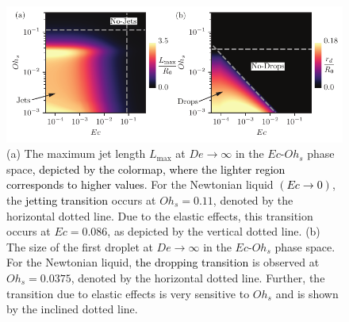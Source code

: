 \documentclass{jfm}
\newcommand{\DL}[1]{{\textcolor{black}{#1}}}
\newcommand{\VS}[1]{{\textcolor{black}{#1}}}
\newcommand{\AO}[1]{{\textcolor{black}{#1}}}
\newcommand{\AKD}[1]{{\textcolor{black}{#1}}}
\begin{document}
\begin{figure}
	\includegraphics[width=\textwidth]{Figures/High_De/High_De_05-eps-converted-to.pdf}
	\caption{(a) The maximum jet length $L_{\text{max}}$ at $De \to \infty$ in the $Ec$-$Oh_s$ phase space\AKD{, depicted by the colormap, where the lighter region corresponds to higher values}. For the Newtonian liquid \DL{$\left(Ec \to 0\right)$}, the \VS{jetting transition} occurs at $Oh_s = 0.11$, denoted by the horizontal dotted line. Due to the elastic effect\AO{s}, this transition occurs at $Ec = 0.086$, as depicted by the vertical dotted line. (b) The size of the first droplet at $De \to \infty$ in the $Ec$-$Oh_s$ phase space. For the Newtonian liquid, \VS{the dropping transition} is observed at $Oh_s = 0.0375$, denoted by the horizontal dotted line. Further, the transition due to elastic effects is very sensitive to $Oh_s$ and is shown by the inclined dotted line.}
	\label{highDe}
\end{figure}
\end{document}
